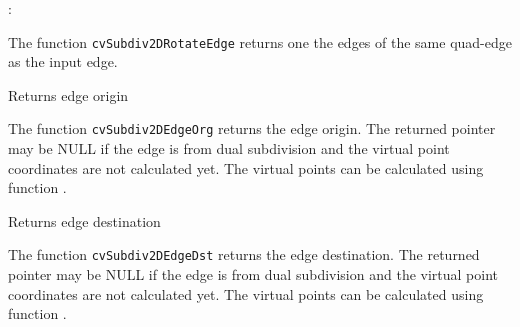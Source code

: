 
\begin{description}
:
\begin{description}
\end{description}
\end{description}

The function \texttt{cvSubdiv2DRotateEdge} returns one the edges of the same quad-edge as the input edge.

\label{Subdiv2DEdgeOrg}

Returns edge origin


\begin{description}
\end{description}

The function \texttt{cvSubdiv2DEdgeOrg} returns the edge
origin. The returned pointer may be NULL if the edge is from dual
subdivision and the virtual point coordinates are not calculated
yet. The virtual points can be calculated using function
.

\label{Subdiv2DEdgeDst}

Returns edge destination


\begin{description}
\end{description}

The function \texttt{cvSubdiv2DEdgeDst} returns the edge destination. The
returned pointer may be NULL if the edge is from dual subdivision and
the virtual point coordinates are not calculated yet. The virtual points
can be calculated using function .

